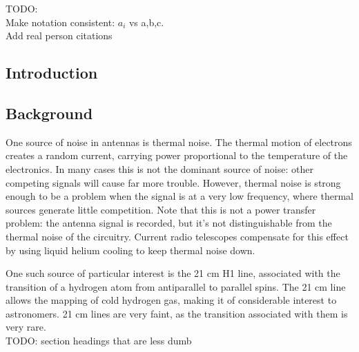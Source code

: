 \documentclass[final]{article}
\begin{document}
TODO:\\
Make notation consistent: \(a_i\) vs a,b,c.\\
Add real person citations

\subsection*{Introduction}
\subsection*{Background}
One source of noise in antennas is thermal noise. The thermal motion of electrons creates a random current, carrying power proportional to the temperature of the electronics. In many cases this is not the dominant source of noise: other competing signals will cause far more trouble. However, thermal noise is strong enough to be a problem when the signal is at a very low frequency, where thermal sources generate little competition. Note that this is not a power transfer problem: the antenna signal is recorded, but it's not distinguishable from the thermal noise of the circuitry. Current radio telescopes compensate for this effect by using liquid helium cooling to keep thermal noise down.

One such source of particular interest is the 21 cm H1 line, associated with the transition of a hydrogen atom from antiparallel to parallel spins. The 21 cm line allows the mapping of cold hydrogen gas, making it of considerable interest to astronomers. 21 cm lines are very faint, as the transition associated with them is very rare.
\\TODO: section headings that are less dumb
\end{document}
